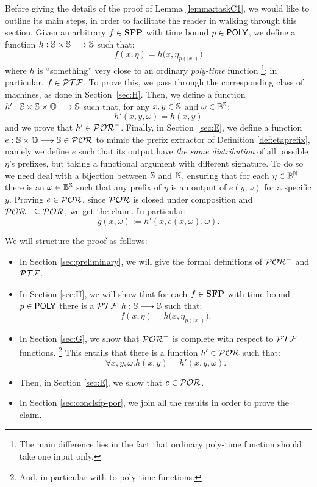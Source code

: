 Before giving the details of the proof of Lemma \ref{lemma:taskC1},
we would like to outline its main steps,
in order to facilitate the reader in walking through this section.
%
Given an arbitrary $f \in \mathbf{SFP}$ with time bound $p \in \mathsf{POLY}$,
we define a function $h:\mathbb{S} \times \mathbb{S} \longrightarrow \mathbb{S}$
such that:
$$
f(x,\eta) = h\big(x, \eta_{p(|x|)}\big)
$$
where $h$ is ``something'' very close to an ordinary \emph{poly-time} function%
\footnote{The main difference lies in the fact that ordinary poly-time function should take one input only.}; in particular, $f \in \mathcal{PTF}$.
To prove this, we pass
through the corresponding class of machines, as done in
Section~\ref{sec:H}.
%
Then, we define a function $h' : \mathbb{S} \times \mathbb{S} \times
\mathbb{O} \longrightarrow \mathbb{S}$ such that, for any $x,y\in \mathbb{S}$ and $\omega \in \mathbb{B}^{\mathbb{S}}$:
$$
h'(x,y,\omega) = h(x,y)
$$
and we prove that $h'\in \mathcal{POR}^-$.
%
Finally, in Section~\ref{sec:E},
we define a function
$e: \mathbb{S} \times \mathbb{O} \longrightarrow \mathbb{S} \in \mathcal{POR}$
to mimic the prefix extractor of Definition \ref{def:etaprefix}, namely we
define $e$ such that its output have
\emph{the same distribution} of all possible $\eta$'s prefixes,
but taking a functional argument with different signature.
To do so we need deal with a bijection between $\mathbb{S}$ and $\mathbb{N}$,
ensuring that for each $\eta \in \mathbb{B}^{\mathbb{N}}$
there is an $\omega\in \mathbb{B}^{\mathbb{S}}$ such that
any prefix of $\eta$ is an output of
$e(y, \omega)$ for a specific $y$.
Proving $e \in\mathcal{POR}$, since $\mathcal{POR}$ is closed under composition and
$\mathcal{POR}^-\subseteq \mathcal{POR}$, we get the claim. In particular:
%
$$
g(x, \omega) := h'(x, e(x, \omega), \omega).
$$

%
\noindent
We will structure the proof as follows:

\begin{itemize}
  \item In Section \ref{sec:preliminary}, we will give the formal
  definitions of $\mathcal{POR}^-$ and $\mathcal{PTF}$.
  \item In Section \ref{sec:H}, we will show that for each $f \in \mathbf{SFP}$
  with time bound $p \in \mathsf{POLY}$ there is a $\mathcal{PTF}$ $h:\mathbb{S} \longrightarrow \mathbb{S}$
  such that:
  $$
  f(x,\eta) = h\big( x, \eta_{p(|x|)}\big).
  $$
  \item In Section \ref{sec:G}, we show that $\mathcal{POR}^-$ is complete
  with respect to $\mathcal{PTF}$ functions.
  \footnote{And, in particular with to poly-time functions.}
  This entails that there is a function
  $h' \in \mathcal{POR}$ such that:
  $$
  \forall x, y, \omega. h(x, y)=h'(x, y, \omega).
  $$
  \item Then, in Section \ref{sec:E}, we show that $e \in \mathcal{POR}$.
  \item In Section \ref{sec:conclsfp-por}, we join all the results in order to prove the claim.
\end{itemize}












